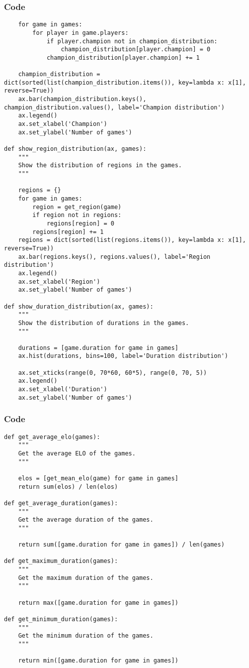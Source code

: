 \documentclass{beamer}
\begin{document}
\begin{frame}[fragile]
    \frametitle{Code}
    \fontsize{3pt}{5pt}\selectfont
    \begin{verbatim}
    for game in games:
        for player in game.players:
            if player.champion not in champion_distribution:
                champion_distribution[player.champion] = 0
            champion_distribution[player.champion] += 1

    champion_distribution = dict(sorted(list(champion_distribution.items()), key=lambda x: x[1], reverse=True))
    ax.bar(champion_distribution.keys(), champion_distribution.values(), label='Champion distribution')
    ax.legend()
    ax.set_xlabel('Champion')
    ax.set_ylabel('Number of games')

def show_region_distribution(ax, games):
    """
    Show the distribution of regions in the games.
    """
    
    regions = {}
    for game in games:
        region = get_region(game)
        if region not in regions:
            regions[region] = 0
        regions[region] += 1
    regions = dict(sorted(list(regions.items()), key=lambda x: x[1], reverse=True))
    ax.bar(regions.keys(), regions.values(), label='Region distribution')
    ax.legend()
    ax.set_xlabel('Region')
    ax.set_ylabel('Number of games')

def show_duration_distribution(ax, games):
    """
    Show the distribution of durations in the games.
    """
    
    durations = [game.duration for game in games]
    ax.hist(durations, bins=100, label='Duration distribution')

    ax.set_xticks(range(0, 70*60, 60*5), range(0, 70, 5))
    ax.legend()
    ax.set_xlabel('Duration')
    ax.set_ylabel('Number of games')
    \end{verbatim}
\end{frame}

\begin{frame}[t, fragile]
    \frametitle{Code}
    \fontsize{3pt}{5pt}\selectfont
    \begin{verbatim}
def get_average_elo(games):
    """
    Get the average ELO of the games.
    """
    
    elos = [get_mean_elo(game) for game in games]
    return sum(elos) / len(elos)

def get_average_duration(games):
    """
    Get the average duration of the games.
    """
    
    return sum([game.duration for game in games]) / len(games)

def get_maximum_duration(games):
    """
    Get the maximum duration of the games.
    """
    
    return max([game.duration for game in games])

def get_minimum_duration(games):
    """
    Get the minimum duration of the games.
    """
    
    return min([game.duration for game in games])
    \end{verbatim}
\end{frame}
\end{document}
